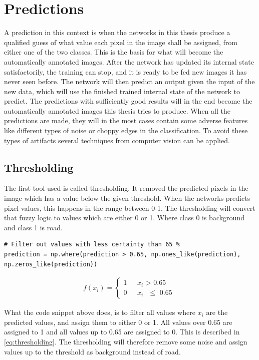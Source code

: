 \documentclass[USenglish]{ifimaster}  %
\begin{document}
\section{Predictions}
A prediction in this context is when the networks in this thesis produce a qualified guess of what value each pixel in the image shall be assigned, from either one of the two classes. This is the basis for what will become the automatically annotated images. After the network has updated its internal state satisfactorily, the training can stop, and it is ready to be fed new images it has never seen before. The network will then predict an output given the input of the new data, which will use the finished trained internal state of the network to predict. The predictions with sufficiently good results will in the end become the automatically annotated images this thesis tries to produce. When all the predictions are made, they will in the most cases contain some adverse features like different types of noise or choppy edges in the classification. To avoid these types of artifacts several techniques from computer vision can be applied. 
\subsection{Thresholding}
The first tool used is called thresholding. It removed the predicted pixels in the image which has a value below the given threshold. When the networks predicts pixel values, this happens in the range between 0-1. The thresholding will convert that fuzzy logic to values which are either 0 or 1. Where class 0 is background and class 1 is road.
\begin{verbatim}
# Filter out values with less certainty than 65 %
prediction = np.where(prediction > 0.65, np.ones_like(prediction), 
np.zeros_like(prediction))
\end{verbatim}

\begin{equation}\label{eq:thresholding}
\begin{aligned}
{f(x_i)=
\begin{cases}
    1 & \text{ $x_i$ > 0.65 }  \\
    0 & \text{ $x_i$ $\leq$ 0.65 }
\end{cases}}
\end{aligned}
\end{equation}

What the code snippet above does, is to filter all values where $x_i$ are the predicted values, and assign them to either 0 or 1. All values over 0.65 are assigned to 1 and all values up to 0.65 are assigned to 0. This is described in \cref{eq:thresholding}. The thresholding will therefore remove some noise and assign values up to the threshold as background instead of road.  
\end{document}
